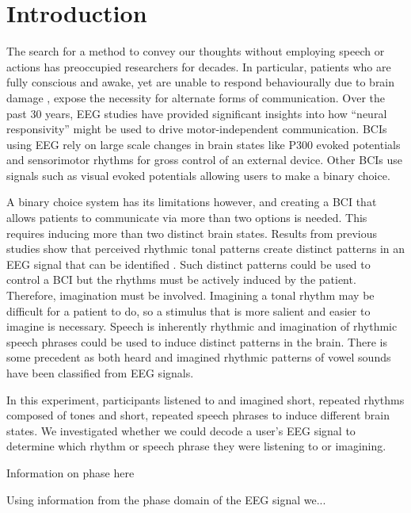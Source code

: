 \section*{Introduction}
The search for a method to convey our thoughts without employing speech or actions has preoccupied researchers for decades.
In particular, patients who are fully conscious and awake, yet are unable to respond behaviourally due to brain damage \cite{owen_2006,monti_2010,cruse_2011}, expose the necessity for alternate forms of communication. 
Over the past 30 years, \ac{EEG} studies have provided significant insights into how ``neural responsivity'' might be used to drive motor-independent communication.
\acp{BCI} using \ac{EEG} rely on large scale changes in brain states like P300 evoked potentials \cite{farwell_1988,mugler_2010,tanaka_2005}  and sensorimotor rhythms \cite{blankertz_2010, pfurtscheller_2001} for gross control of an external device.
Other \acp{BCI} use signals such as visual evoked potentials \cite{miranda_2011, wang_2006} allowing users to make a binary choice. 

A binary choice system has its limitations however, and creating a \ac{BCI} that allows patients to communicate via more than two options is needed.
This requires inducing more than two distinct brain states.
Results from previous studies show that perceived rhythmic tonal patterns create distinct patterns in an EEG signal that can be identified \cite{stober2014}.
Such distinct patterns could be used to control a \ac{BCI} but the rhythms must be actively induced by the patient. 
Therefore, imagination must be involved.
Imagining a tonal rhythm may be difficult for a patient to do, so a stimulus that is more salient and easier to imagine is necessary.
Speech is inherently rhythmic and imagination of rhythmic speech phrases could be used to induce distinct patterns in the brain.
There is some precedent as both heard \cite{Formisano2008} and imagined \cite{Deng2010} rhythmic patterns of vowel sounds have been classified from EEG signals. 

In this experiment, participants listened to and imagined short, repeated rhythms composed of tones and short, repeated speech phrases to induce different brain states.
We investigated whether we could decode a user's \ac{EEG} signal to determine which rhythm or speech phrase they were listening to or imagining.

Information on phase here

Using information from the phase domain of the EEG signal we...